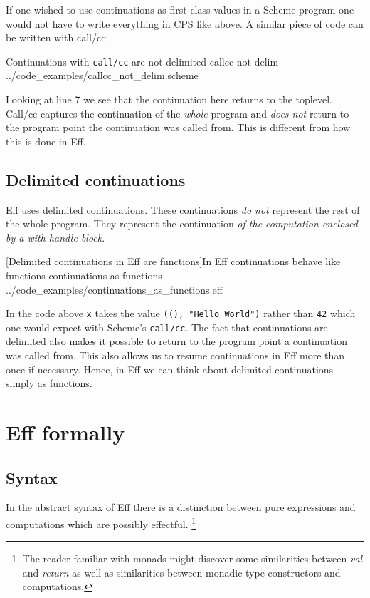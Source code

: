 \documentclass[class=article, crop=false]{standalone}
\begin{document}
If one wished to use continuations as first-class values in a Scheme program
one would not have to write everything in CPS like above. A similar piece of
code can be written with call/cc:

{Continuations with \lstinline{call/cc} are not delimited}
{callcc-not-delim}
{../code_examples/callcc_not_delim.scheme}

Looking at line 7 we see that the continuation here returns to the toplevel.
Call/cc captures the continuation of the \emph{whole} program and
\emph{does not} return to the program point the continuation was called from.
This is different from how this is done in Eff.

\subsection{Delimited continuations}

Eff uses delimited continuations. These continuations \emph{do not} represent
the rest of the whole program. They represent the continuation
\emph{of the computation enclosed by a with-handle block}.

{[Delimited continuations in Eff are functions]In Eff continuations behave like functions}
{continuations-as-functions}
{../code_examples/continuations_as_functions.eff}

In the code above \lstinline{x} takes the value \lstinline{((), "Hello World")}
rather than \lstinline{42} which one would expect with Scheme's
\lstinline|call/cc|. The fact that continuations are delimited also makes it
possible to return to the program point a continuation was called from. This
also allows us to resume continuations in Eff more than once if necessary.
Hence, in Eff we can think about delimited continuations simply as functions.

\section{Eff formally}

\subsection{Syntax}

In the abstract syntax of Eff there is a distinction between pure expressions
and computations which are possibly effectful.
\footnote{The reader familiar with monads might discover some similarities
between \emph{val} and \emph{return} as well as similarities between monadic
type constructors and computations.}
\end{document}
